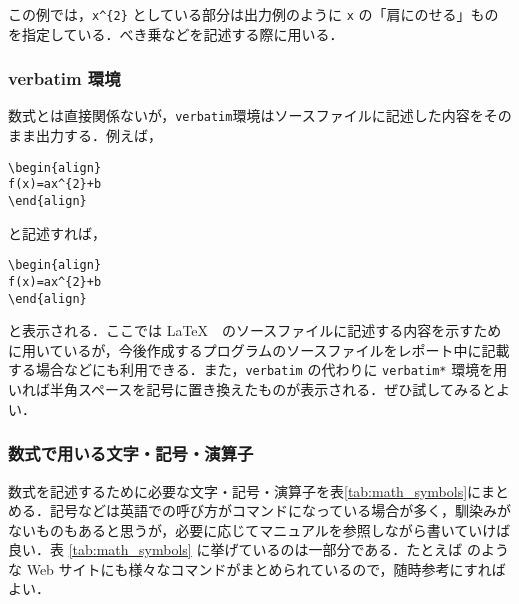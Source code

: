 この例では，\verb|x^{2}| としている部分は出力例のように \verb|x| の「肩にのせる」ものを指定している．べき乗などを記述する際に用いる．

\subsubsection{verbatim 環境}

数式とは直接関係ないが，\verb|verbatim|環境はソースファイルに記述した内容をそのまま出力する．例えば，
\begin{screen}
\begin{verbatim*}
\begin{verbatim}
\begin{align}
f(x)=ax^{2}+b
\end{align}
\end{verbatim}
\end{verbatim*}
\end{screen}
と記述すれば，
\begin{verbatim}
\begin{align}
f(x)=ax^{2}+b
\end{align}
\end{verbatim}
と表示される．ここでは \LaTeX　のソースファイルに記述する内容を示すために用いているが，今後作成するプログラムのソースファイルをレポート中に記載する場合などにも利用できる．また，\verb|verbatim| の代わりに \verb|verbatim*| 環境を用いれば半角スペースを記号に置き換えたものが表示される．ぜひ試してみるとよい．

\subsubsection{数式で用いる文字・記号・演算子}

数式を記述するために必要な文字・記号・演算子を表\ref{tab:math_symbols}にまとめる．記号などは英語での呼び方がコマンドになっている場合が多く，馴染みがないものもあると思うが，必要に応じてマニュアルを参照しながら書いていけば良い．表 \ref{tab:math_symbols} に挙げているのは一部分である．たとえば \cite{Kagishippo} のような Web サイトにも様々なコマンドがまとめられているので，随時参考にすればよい．

